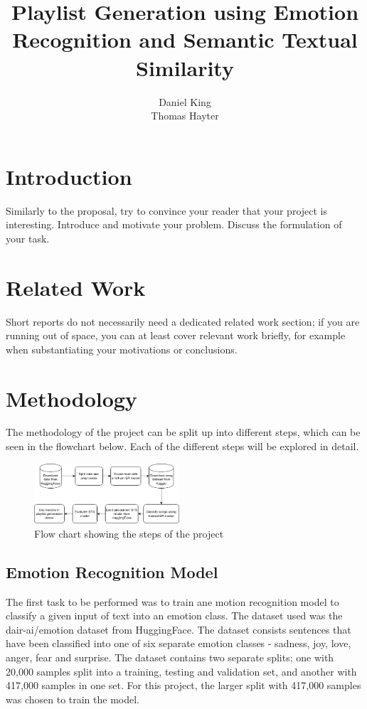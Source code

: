 \documentclass[11pt]{article}
\title{Playlist Generation using Emotion Recognition and Semantic Textual Similarity}
\author{
    Daniel King \\
    \And
    Thomas Hayter \\
}
\begin{document}
\maketitle


\section{Introduction}

Similarly to the proposal, try to convince your reader that your project is interesting. Introduce and motivate your problem. Discuss the formulation of your task.

\section{Related Work}
Short reports do not necessarily need a dedicated related work section; if you are running out of space, you can at least cover relevant work briefly, for example when substantiating your motivations or conclusions.


\section{Methodology}
The methodology of the project can be split up into different steps, which can be seen in the flowchart below. Each of the different steps will be explored in detail.

\begin{figure}[H]
    \centering
    \includegraphics[width=0.48\textwidth]{images/codeFlow.png}
    \caption{Flow chart showing the steps of the project}
\end{figure}

\subsection{Emotion Recognition Model}
The first task to be performed was to train ane motion recognition model to classify a given input of text into an emotion class. The dataset used was the dair-ai/emotion dataset \cite{emotiondata} from HuggingFace. The dataset consists sentences that have been classified into one of six separate emotion classes - sadness, joy, love, anger, fear and surprise. The dataset contains two separate splits; one with 20,000 samples split into a training, testing and validation set, and another with 417,000 samples in one set. For this project, the larger split with 417,000 samples was chosen to train the model.
\end{document}
